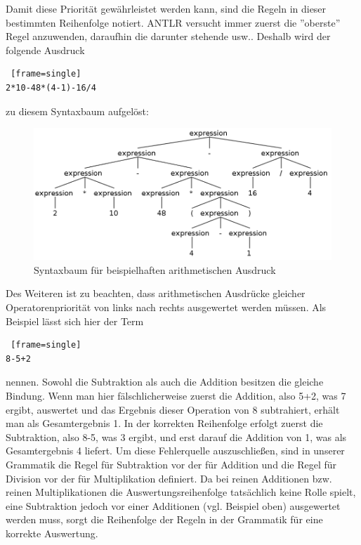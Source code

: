 Damit diese Priorität gewährleistet werden kann, sind die Regeln in dieser bestimmten Reihenfolge notiert. ANTLR versucht immer zuerst die ''oberste'' Regel anzuwenden, daraufhin die darunter stehende usw.. Deshalb wird der folgende Ausdruck 

\begin{lstlisting} [frame=single]
2*10-48*(4-1)-16/4
\end{lstlisting}

zu diesem Syntaxbaum aufgelöst:

\begin{figure}[h!]
\centering
\includegraphics[scale=0.4]{pics/antlr4_parse_tree_arithmetic.png}
\caption{Syntaxbaum für beispielhaften arithmetischen Ausdruck}
\end{figure}

Des Weiteren ist zu beachten, dass arithmetischen Ausdrücke gleicher Operatorenpriorität von links  nach rechts ausgewertet werden müssen. Als Beispiel lässt sich hier der Term 
\begin{lstlisting} [frame=single]
8-5+2
\end{lstlisting}
nennen. Sowohl die Subtraktion als auch die Addition besitzen die gleiche Bindung. Wenn man hier fälschlicherweise zuerst die Addition, also 5+2, was 7 ergibt, auswertet und das Ergebnis dieser Operation von 8 subtrahiert, erhält man als Gesamtergebnis 1. 
In der korrekten Reihenfolge erfolgt zuerst die Subtraktion, also 8-5, was 3 ergibt, und erst darauf die Addition von 1, was als Gesamtergebnis 4 liefert. 
Um diese Fehlerquelle auszuschließen, sind in unserer Grammatik die Regel für Subtraktion vor der für Addition und die Regel für Division vor der für Multiplikation definiert. Da bei reinen Additionen bzw. reinen Multiplikationen die Auswertungsreihenfolge tatsächlich keine Rolle spielt, eine Subtraktion jedoch vor einer Additionen (vgl. Beispiel oben) ausgewertet werden muss, sorgt die Reihenfolge der Regeln in der Grammatik für eine korrekte Auswertung.

